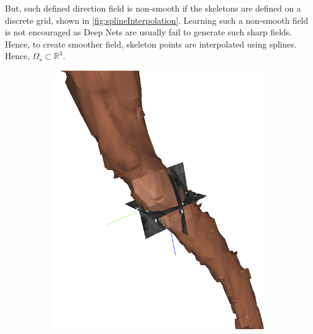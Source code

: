 But, such defined direction field is non-smooth if the skeletons are defined on a discrete grid, shown in \autoref{fig:splineInterpolation}. Learning such a non-smooth field is not encouraged as Deep Nets are usually fail to generate such sharp fields. Hence, to create smoother field, skeleton points are interpolated using splines. Hence, $\Omega_s \subset \mathbb{R}^3$.

\begin{figure}[htpb]
	\newcommand{\mywidth}{0.22\textwidth}
	\centering
	\hspace{3mm}
	\begin{subfigure}[b]{\mywidth}
		\centering
		\includegraphics[width=\textwidth]{data/images/interpolation/slice_edited.png}
		\caption{\label{fig:3dseg_slice}}
	\end{subfigure}
	\hspace{3mm}
	\begin{subfigure}[b]{\mywidth}
		\centering

\end{subfigure}
\end{figure}
